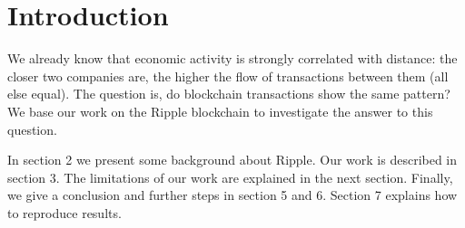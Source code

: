 \section{Introduction}


We already know that economic activity is strongly correlated with distance: the closer two companies are, the higher the flow of transactions between them (all else equal). The question is, do blockchain transactions show the same pattern? We base our work on the Ripple blockchain to investigate the answer to this question.
\vspace{\baselineskip}

In section 2 we present some background about Ripple. Our work is described in section 3. The limitations of our work are explained in the next section. Finally, we give a conclusion and further steps in section 5 and 6. Section 7 explains how to reproduce results.